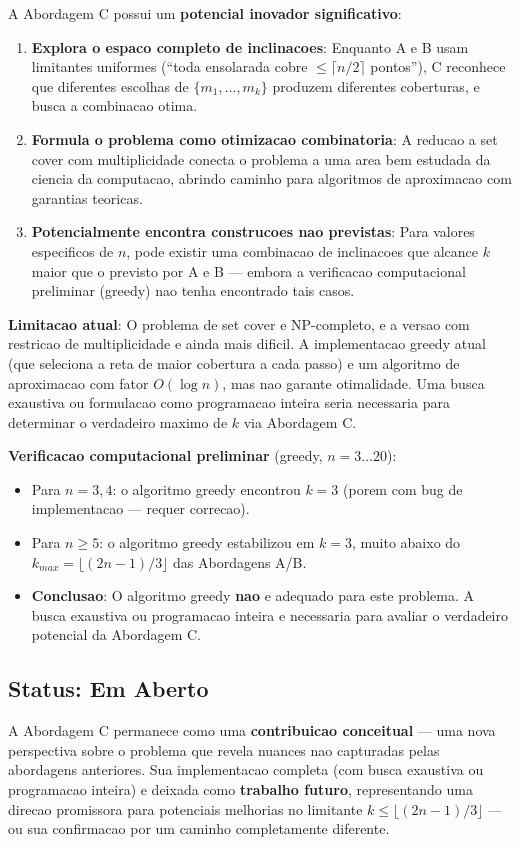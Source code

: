 \documentclass[5p]{elsarticle}
\theoremstyle{definition}
\begin{document}
A Abordagem C possui um \textbf{potencial inovador significativo}:

\begin{enumerate}[label=(\alph*)]
  \item \textbf{Explora o espaco completo de inclinacoes}: Enquanto A e B usam
    limitantes uniformes (``toda ensolarada cobre $\leq \lceil n/2 \rceil$ pontos''),
    C reconhece que diferentes escolhas de $\{m_1, \dots, m_k\}$ produzem diferentes
    coberturas, e busca a combinacao otima.
  \item \textbf{Formula o problema como otimizacao combinatoria}: A reducao a set
    cover com multiplicidade conecta o problema a uma area bem estudada da ciencia
    da computacao, abrindo caminho para algoritmos de aproximacao com garantias
    teoricas.
  \item \textbf{Potencialmente encontra construcoes nao previstas}: Para valores
    especificos de $n$, pode existir uma combinacao de inclinacoes que alcance
    $k$ maior que o previsto por A e B — embora a verificacao computacional
    preliminar (greedy) nao tenha encontrado tais casos.
\end{enumerate}

\textbf{Limitacao atual}: O problema de set cover e NP-completo, e a versao com
restricao de multiplicidade e ainda mais dificil. A implementacao greedy atual
(que seleciona a reta de maior cobertura a cada passo) e um algoritmo de
aproximacao com fator $O(\log n)$, mas nao garante otimalidade. Uma busca
exaustiva ou formulacao como programacao inteira seria necessaria para
determinar o verdadeiro maximo de $k$ via Abordagem C.

\textbf{Verificacao computacional preliminar} (greedy, $n = 3 \dots 20$):
\begin{itemize}
  \item Para $n = 3,4$: o algoritmo greedy encontrou $k = 3$ (porem com bug
    de implementacao — requer correcao).
  \item Para $n \geq 5$: o algoritmo greedy estabilizou em $k = 3$, muito
    abaixo do $k_{max} = \lfloor(2n-1)/3\rfloor$ das Abordagens A/B.
  \item \textbf{Conclusao}: O algoritmo greedy \textbf{nao} e adequado para
    este problema. A busca exaustiva ou programacao inteira e necessaria
    para avaliar o verdadeiro potencial da Abordagem C.
\end{itemize}

\subsection{Status: Em Aberto}

A Abordagem C permanece como uma \textbf{contribuicao conceitual} — uma nova
perspectiva sobre o problema que revela nuances nao capturadas pelas abordagens
anteriores. Sua implementacao completa (com busca exaustiva ou programacao
inteira) e deixada como \textbf{trabalho futuro}, representando uma direcao
promissora para potenciais melhorias no limitante $k \leq \lfloor(2n-1)/3\rfloor$
— ou sua confirmacao por um caminho completamente diferente.
\end{document}
